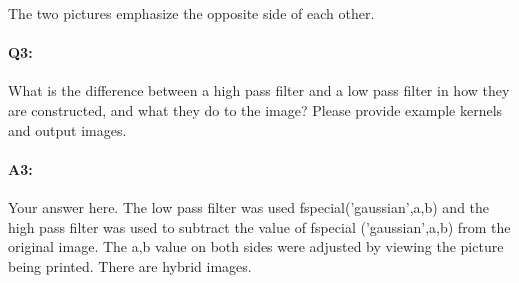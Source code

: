 	The two pictures emphasize the opposite side of each other.
	
	
	
	\pagebreak
	\paragraph{Q3:} What is the difference between a high pass filter and a low pass filter in how they are constructed, and what they do to the image? Please provide example kernels and output images.
	
	\paragraph{A3:} Your answer here.
	The low pass filter was used fspecial('gaussian',a,b) and the high pass filter was used to subtract the value of fspecial ('gaussian',a,b) from the original image. The a,b value on both sides were adjusted by viewing the picture being printed.	
There are hybrid images.
